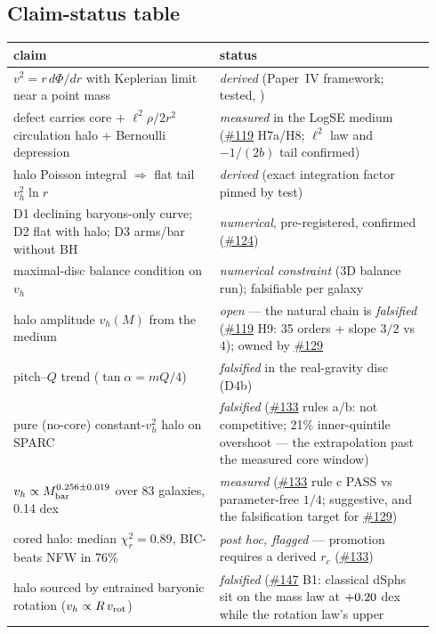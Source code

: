 \documentclass[11pt,a4paper]{article}
\providecommand{\ssvfile}[1]{\hyperref[file:#1]{\texttt{\detokenize{#1}}}}
\providecommand{\ssvissue}[1]{\hyperref[issue:#1]{\##1}}
\begin{document}
\subsection{Claim-status table}

\begin{center}\small
\renewcommand{\arraystretch}{1.3}
\begin{tabular}{@{}p{0.46\linewidth}p{0.48\linewidth}@{}}
\toprule
claim & status \\
\midrule
$v^2 = r\,d\Phi/dr$ with Keplerian limit near a point mass &
\emph{derived} (Paper~IV framework; tested,
\ssvfile{rotation_curve_timedilation}) \\
defect carries core + $\ell^2\rho/2r^2$ circulation halo + Bernoulli
depression &
\emph{measured} in the LogSE medium (\ssvissue{119} H7a/H8; $\ell^2$ law
and $-1/(2b)$ tail confirmed) \\
halo Poisson integral $\Rightarrow$ flat tail $v_h^2 \ln r$ &
\emph{derived} (exact integration factor pinned by test) \\
D1 declining baryons-only curve; D2 flat with halo; D3 arms/bar without
BH & \emph{numerical}, pre-registered, confirmed (\ssvissue{124}) \\
maximal-disc balance condition on $v_h$ &
\emph{numerical constraint} (3D balance run); falsifiable per galaxy \\
halo amplitude $v_h(M)$ from the medium &
\emph{open} --- the natural chain is \emph{falsified}
(\ssvissue{119} H9: 35 orders + slope $3/2$ vs $4$); owned by
\ssvissue{129} \\
pitch--$Q$ trend ($\tan\alpha = mQ/4$) &
\emph{falsified} in the real-gravity disc (D4b) \\
pure (no-core) constant-$v_h^2$ halo on SPARC &
\emph{falsified} (\ssvissue{133} rules a/b: not competitive; 21\%
inner-quintile overshoot --- the extrapolation past the measured core
window) \\
$v_h \propto M_{\rm bar}^{0.256\pm0.019}$ over 83 galaxies, 0.14 dex &
\emph{measured} (\ssvissue{133} rule c PASS vs parameter-free $1/4$;
suggestive, and the falsification target for \ssvissue{129}) \\
cored halo: median $\chi^2_r = 0.89$, BIC-beats NFW in 76\% &
\emph{post hoc, flagged} --- promotion requires a derived $r_c$
(\ssvissue{133}) \\
halo sourced by entrained baryonic rotation
($v_h \propto R\,v_{\rm rot}$) &
\emph{falsified} (\ssvissue{147} B1: classical dSphs sit on the mass
law at $+0.20$ dex while the rotation law's upper

\end{tabular}
\end{center}
\end{document}
